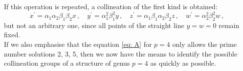 \documentclass[leqno]{article}
\begin{document}
If this operation is repeated, a collineation of the first kind is obtained:
\begin{equation}\label{eq: 2.6}
x^\prime = \alpha_1 \alpha_2 \beta_1 \beta_2 x \, , \quad y^\prime = \alpha_1^2 \beta_1^2 y \, , \quad z^\prime = \alpha_1 \beta_1 \alpha_2 \beta_2 z \, , \quad w^\prime = \alpha_2^2 \beta_2^2 w \, , \tag{6}
\end{equation}
but not an arbitrary one, since all points of the straight line $ y = w = 0 $ remain fixed. \\
If we also emphasise that the equation \eqref{eq: A} for $ p = 4 $ only allows the prime number solutions 2, 3, 5, then we now have the means to identify the possible collineation groups of a structure of genus $ p = 4 $ as quickly as possible.
\end{document}

